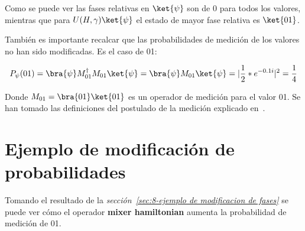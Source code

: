 Como se puede ver las fases relativas  %
en $\ket{\psi}$ son de 0 para todos los valores, mientras que para $U(H, \gamma) \ket{\psi}$ el estado de mayor fase relativa es $\ket{01}$.

También es importante recalcar que las probabilidades de medición de los valores no han sido modificadas. Es el caso de 01:

\begin{align*}
  P_{\psi}(01) = \bra{\psi}M_{01}^\dagger M_{01}\ket{\psi} = \bra{\psi}M_{01}\ket{\psi} = |\frac{1}{2}*e^{-0.1i}|^2 = \frac{1}{4}
\end{align*}

Donde $M_{01} = \bra{01}\ket{01}$ es un operador de medición para el valor 01.
Se han tomado las definiciones del postulado de la medición explicado en~\cite{Nielsen_Chuang_2010}.


\section{Ejemplo de modificación de probabilidades}
Tomando el resultado de la \textit{sección~\ref{sec:8-ejemplo de modificacion de fases}} se puede ver cómo el operador \textbf{mixer hamiltonian} aumenta la probabilidad de medición de 01.

